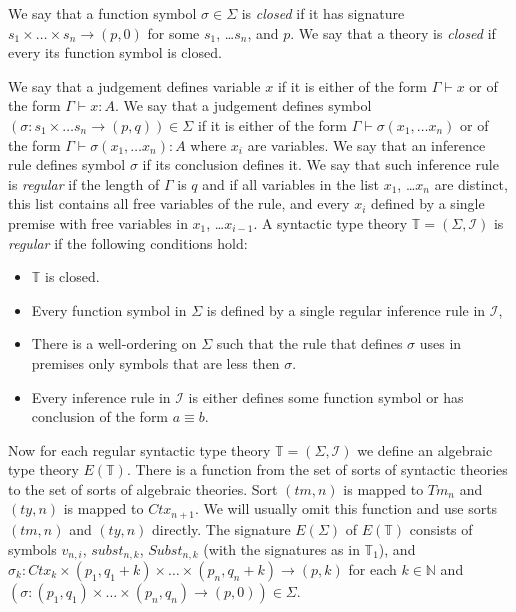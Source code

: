 \documentclass[reqno]{amsart}
\theoremstyle{definition}
\theoremstyle{remark}
\newcommand{\deq}{\equiv}
\numberwithin{figure}{section}
\begin{document}
We say that a function symbol $\sigma \in \Sigma$ is \emph{closed} if it has signature $s_1 \times \ldots \times s_n \to (p,0)$ for some $s_1$, \ldots $s_n$, and $p$.
We say that a theory is \emph{closed} if every its function symbol is closed.

We say that a judgement defines variable $x$ if it is either of the form $\Gamma \vdash x$ or of the form $\Gamma \vdash x : A$.
We say that a judgement defines symbol $(\sigma : s_1 \times \ldots s_n \to (p,q)) \in \Sigma$ if it is either
of the form $\Gamma \vdash \sigma(x_1, \ldots x_n)$ or of the form $\Gamma \vdash \sigma(x_1, \ldots x_n) : A$ where $x_i$ are variables.
We say that an inference rule defines symbol $\sigma$ if its conclusion defines it.
We say that such inference rule is \emph{regular} if the length of $\Gamma$ is $q$ and
if all variables in the list $x_1$, \ldots $x_n$ are distinct, this list contains all free variables of the rule,
and every $x_i$ defined by a single premise with free variables in $x_1$, \ldots $x_{i-1}$.
A syntactic type theory $\mathbb{T} = (\Sigma, \mathcal{I})$ is \emph{regular} if the following conditions hold:
\begin{itemize}
\item $\mathbb{T}$ is closed.
\item Every function symbol in $\Sigma$ is defined by a single regular inference rule in $\mathcal{I}$,
\item There is a well-ordering on $\Sigma$ such that the rule that defines $\sigma$ uses in premises only symbols that are less then $\sigma$.
\item Every inference rule in $\mathcal{I}$ is either defines some function symbol or has conclusion of the form $a \deq b$.
\end{itemize}

Now for each regular syntactic type theory $\mathbb{T} = (\Sigma, \mathcal{I})$ we define an algebraic type theory $E(\mathbb{T})$.
There is a function from the set of sorts of syntactic theories to the set of sorts of algebraic theories.
Sort $(tm,n)$ is mapped to $Tm_n$ and $(ty,n)$ is mapped to $Ctx_{n+1}$.
We will usually omit this function and use sorts $(tm,n)$ and $(ty,n)$ directly.
The signature $E(\Sigma)$ of $E(\mathbb{T})$ consists of symbols $v_{n,i}$, $subst_{n,k}$, $Subst_{n,k}$ (with the signatures as in $\mathbb{T}_1$), and
$\sigma_k : Ctx_k \times (p_1,q_1+k) \times \ldots \times (p_n,q_n+k) \to (p,k)$
for each $k \in \mathbb{N}$ and $(\sigma : (p_1,q_1) \times \ldots \times (p_n,q_n) \to (p,0)) \in \Sigma$.
\end{document}
